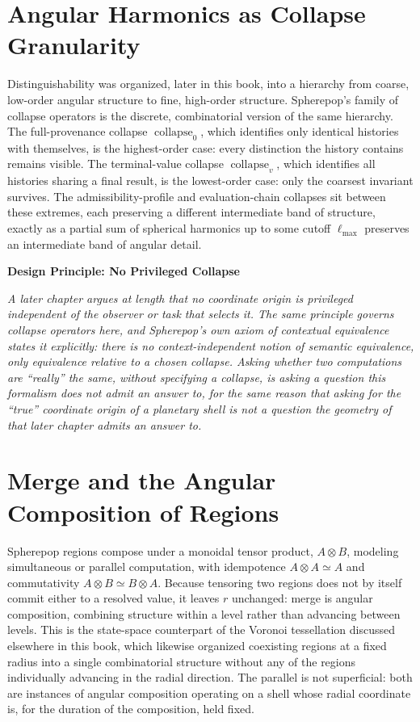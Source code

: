 \documentclass[11pt,fleqn]{book}
\numberwithin{equation}{chapter}
\newenvironment{principle}[1]
  {\begin{principleEnv}
   \noindent\textbf{Design Principle: #1}\par\smallskip\itshape}
  {\end{principleEnv}}
\theoremstyle{plain}
\theoremstyle{definition}
\theoremstyle{remark}
\providecommand{\enquote}[1]{``#1''}
\providecommand{\scollapse}[1]{\operatorname{collapse}_{#1}}
\begin{document}
\section{Angular Harmonics as Collapse Granularity}

Distinguishability was organized, later in this book, into a hierarchy from coarse, low-order angular structure to fine, high-order structure. Spherepop's family of collapse operators is the discrete, combinatorial version of the same hierarchy. The full-provenance collapse \(\scollapse{0}\), which identifies only identical histories with themselves, is the highest-order case: every distinction the history contains remains visible. The terminal-value collapse \(\scollapse{v}\), which identifies all histories sharing a final result, is the lowest-order case: only the coarsest invariant survives. The admissibility-profile and evaluation-chain collapses sit between these extremes, each preserving a different intermediate band of structure, exactly as a partial sum of spherical harmonics up to some cutoff \(\ell_{\max}\) preserves an intermediate band of angular detail.

\begin{principle}{No Privileged Collapse}
A later chapter argues at length that no coordinate origin is privileged independent of the observer or task that selects it. The same principle governs collapse operators here, and Spherepop's own axiom of contextual equivalence states it explicitly: there is no context-independent notion of semantic equivalence, only equivalence relative to a chosen collapse. Asking whether two computations are \enquote{really} the same, without specifying a collapse, is asking a question this formalism does not admit an answer to, for the same reason that asking for the \enquote{true} coordinate origin of a planetary shell is not a question the geometry of that later chapter admits an answer to.
\end{principle}

\section{Merge and the Angular Composition of Regions}

Spherepop regions compose under a monoidal tensor product, \(A\otimes B\), modeling simultaneous or parallel computation, with idempotence \(A\otimes A\simeq A\) and commutativity \(A\otimes B\simeq B\otimes A\). Because tensoring two regions does not by itself commit either to a resolved value, it leaves \(r\) unchanged: merge is angular composition, combining structure within a level rather than advancing between levels. This is the state-space counterpart of the Voronoi tessellation discussed elsewhere in this book, which likewise organized coexisting regions at a fixed radius into a single combinatorial structure without any of the regions individually advancing in the radial direction. The parallel is not superficial: both are instances of angular composition operating on a shell whose radial coordinate is, for the duration of the composition, held fixed.
\end{document}
